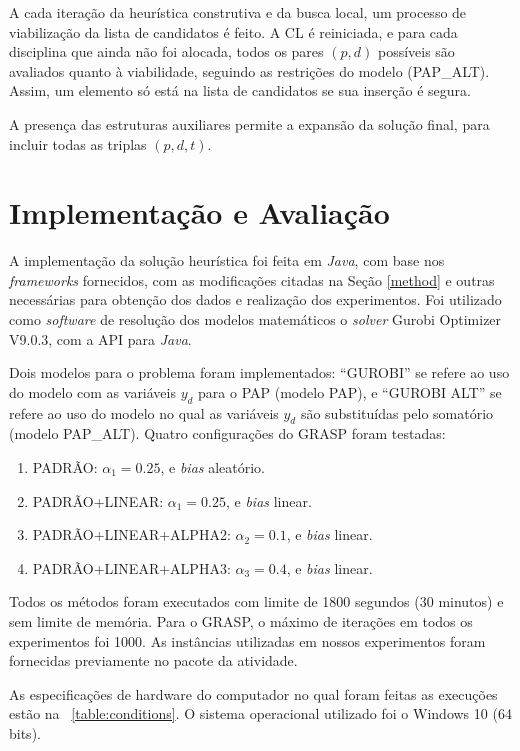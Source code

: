 \documentclass{MO824}
\begin{document}
    A cada iteração da heurística construtiva e da busca local, um processo de viabilização da lista de candidatos é feito. A CL é reiniciada, e para cada disciplina que ainda não foi alocada, todos os pares $(p,d)$ possíveis são avaliados quanto à viabilidade, seguindo as restrições do modelo (PAP\_ALT). Assim, um elemento só está na lista de candidatos se sua inserção é segura.
    
    A presença das estruturas auxiliares permite a expansão da solução final, para incluir todas as triplas $(p,d,t)$.

\section{Implementação e Avaliação}
    A implementação da solução heurística foi feita em \emph{Java}, com base nos \textit{frameworks} fornecidos, com as modificações citadas na Seção \ref{method} e outras necessárias para obtenção dos dados e realização dos experimentos. Foi utilizado como \textit{software} de resolução dos modelos matemáticos o \textit{solver} Gurobi Optimizer V9.0.3, com a API para \emph{Java}.
    
    Dois modelos para o problema foram implementados: ``GUROBI'' se refere ao uso do modelo com as variáveis $y_d$ para o PAP (modelo PAP), e ``GUROBI ALT'' se refere ao uso do modelo no qual as variáveis $y_d$ são substituídas pelo somatório (modelo PAP\_ALT). Quatro configurações do GRASP foram testadas:
    
    \begin{enumerate}
        \item PADRÃO: $\alpha_1=0.25$, e \textit{bias} aleatório.
        \item PADRÃO+LINEAR: $\alpha_1=0.25$, e \textit{bias} linear.
        \item PADRÃO+LINEAR+ALPHA2: $\alpha_2=0.1$, e \textit{bias} linear.
        \item PADRÃO+LINEAR+ALPHA3: $\alpha_3=0.4$, e \textit{bias} linear.
    \end{enumerate}

    Todos os métodos foram executados com limite de 1800 segundos (30 minutos) e sem limite de memória. Para o GRASP, o máximo de iterações em todos os experimentos foi 1000. As instâncias utilizadas em nossos experimentos foram fornecidas previamente no pacote da atividade. 
    
    As especificações de hardware do computador no qual foram feitas as execuções estão na \tablename~\ref{table:conditions}. O sistema operacional utilizado foi o Windows 10 (64 bits).
    
\end{document}
